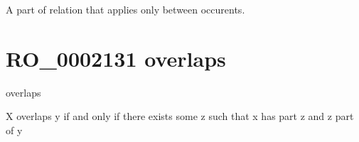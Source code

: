 \documentclass[letterpaper,10pt,english]{sphinxmanual}
\begin{document}
\begin{sphinxShadowBox}

\sphinxAtStartPar
A part of relation that applies only between occurents.
\end{sphinxShadowBox}

\begin{sphinxShadowBox}

\sphinxAtStartPar
{}

\sphinxAtStartPar
{}
\end{sphinxShadowBox}
\begin{quote}
\label{\detokenize{doc-RO_0002131:ro-0002131}}\label{\detokenize{doc-RO_0002131:overlaps}}\label{\detokenize{doc-RO_0002131:ro-0002131}}
\ignorespaces \end{quote}


\section{RO\_0002131 \sphinxhyphen{} overlaps}
\label{\detokenize{doc-RO_0002131:ro-0002131-overlaps}}\label{\detokenize{doc-RO_0002131:index-0}}\label{\detokenize{doc-RO_0002131::doc}}
\begin{sphinxShadowBox}

\sphinxAtStartPar
overlaps
\end{sphinxShadowBox}

\begin{sphinxShadowBox}

\sphinxAtStartPar
X overlaps y if and only if there exists some z such that x has part z and z part of y
\end{sphinxShadowBox}

\begin{sphinxShadowBox}

\sphinxAtStartPar
{}
\end{sphinxShadowBox}
\begin{quote}
\label{\detokenize{doc-RO_0002234:ro-0002234}}\label{\detokenize{doc-RO_0002234:has-output}}\label{\detokenize{doc-RO_0002234:ro-0002234}}
\ignorespaces \end{quote}
\end{document}
